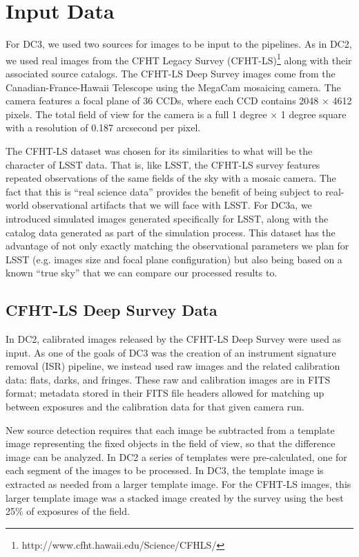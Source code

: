 
\section{Input Data}

For DC3, we used two sources for images to be input to the pipelines.
As in DC2, we used real images from the CFHT Legacy Survey
(CFHT-LS)\footnote{http://www.cfht.hawaii.edu/Science/CFHLS/} along
with their associated source catalogs.  The CFHT-LS Deep Survey images
come from the Canadian-France-Hawaii Telescope using the MegaCam
mosaicing camera. The camera features a focal plane of 36 CCDs, where
each CCD contains 2048 $\times$ 4612 pixels. The total field of view
for the camera is a full 1 degree $\times$ 1 degree square with a
resolution of 0.187 arcsecond per pixel.

The CFHT-LS dataset was chosen for its similarities to what will be
the character of LSST data.  That is, like LSST, the CFHT-LS survey
features repeated observations of the same fields of the sky with a
mosaic camera.  The fact that this is ``real science data'' provides
the benefit of being subject to real-world observational artifacts
that we will face with LSST.  For DC3a, we introduced simulated images
generated specifically for LSST, along with the catalog data generated
as part of the simulation process.  This dataset has the advantage of
not only exactly matching the observational parameters we plan for
LSST (e.g. images size and focal plane configuration) but also being
based on a known ``true sky'' that we can compare our processed
results to.

\subsection{CFHT-LS Deep Survey Data}

In DC2, calibrated images released by the CFHT-LS Deep Survey were used as 
input. As one of the goals of DC3 was the creation of an instrument signature 
removal (ISR) pipeline, we instead used raw images and the related 
calibration data: flats, darks, and fringes. These raw and calibration
images are in FITS format; metadata stored in their FITS file 
headers allowed for matching up between exposures and the calibration
data for that given camera run.

New source detection requires that each image be subtracted from a
template image representing the fixed objects in the field of view,
so that the difference image can be analyzed. In DC2 a series of 
templates were pre-calculated, one for each segment of the images to 
be processed. In DC3, the template image is extracted as needed
from a larger template image. For the CFHT-LS images, this larger
template image was a stacked image created by the survey using
the best 25\% of exposures of the field.



